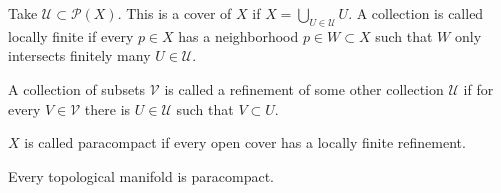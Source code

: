 \documentclass[12pt]{scrartcl}
\let \mc \mathcal
\begin{document}
\begin{definition} Take $\mc U \subset \mc P(X)$.  This is a cover of $X$ if $X = \bigcup_{U \in \mc U} U$.  A collection is called locally finite if every $p \in X$ has a neighborhood $p \in W \subset X$ such that $W$ only intersects finitely many $U \in \mc U$.    
\end{definition}

\begin{definition} A collection of subsets $\mc V$ is called a refinement of some other collection $\mc U$ if for every $V \in \mc V$ there is $U \in \mc U$ such that $V \subset U$.  
\end{definition}

\begin{definition} $X$ is called paracompact if every open cover has a locally finite refinement. 
\end{definition}
\begin{thm} Every topological manifold is paracompact.  
\end{thm}
\end{document}
